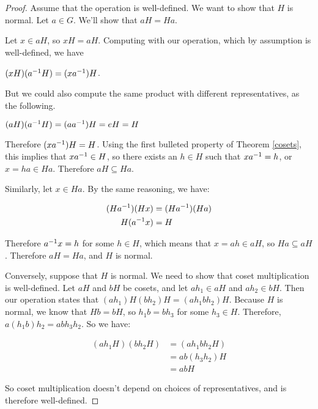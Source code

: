 \begin{proof}

Assume that the operation is well-defined. We want to show that $H$ is normal. Let $a \in G$. We'll show that $aH = Ha$.

Let $x \in aH$, so $xH = aH$. Computing with our operation, which by assumption is well-defined, we have

\begin{center}
    $(xH)(a^{-1} H) = (xa^{-1})H$.
\end{center}

But we could also compute the same product with different representatives, as the following.

\begin{center}
    $(aH)(a^{-1} H) = (a a^{-1})H = eH = H$
\end{center}

Therefore $(xa^{-1})H = H$. Using the first bulleted property of Theorem \ref{cosets}, this implies that $xa^{-1} \in H$, so there exists an $h \in H$ such that $xa^{-1} = h$, or $x = ha \in Ha$. Therefore $aH \subseteq Ha$.

Similarly, let $x \in Ha$. By the same reasoning, we have:

\begin{align*}
    (Ha^{-1})(Hx) &= (Ha^{-1})(Ha) \\
    H(a^{-1} x) &= H \\
\end{align*}

Therefore $a^{-1} x = h$ for some $h \in H$, which means that $x = ah \in aH$, so $Ha \subseteq aH$. Therefore $aH = Ha$, and $H$ is normal.

Conversely, suppose that $H$ is normal. We need to show that coset multiplication is well-defined. Let $aH$ and $bH$ be cosets, and let $ah_1 \in aH$ and $ah_2 \in bH$. Then our operation states that $(ah_1)H(bh_2)H = (ah_1bh_2)H$. Because $H$ is normal, we know that $Hb = bH$, so $h_1 b = b h_3$ for some $h_3 \in H$. Therefore, $a\left(h_1b\right) h_2 = ab h_3 h_2$. So we have:

\begin{align*}
    \left(ah_1 H\right)\left(bh_2 H\right) &= \left(ah_1bh_2 H\right) \\
    &= ab\left(h_3 h_2\right)H \\
    &= ab H
\end{align*}

So coset multiplication doesn't depend on choices of representatives, and is therefore well-defined.

\end{proof}